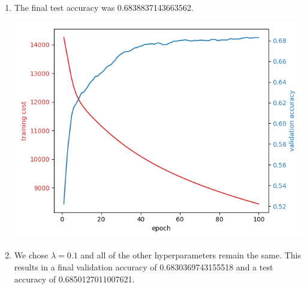 \documentclass{article}
\begin{document}
\begin{enumerate}[label=\arabic*.]
\begin{enumerate}[label=(\roman*)]
\begin{enumerate}[label=(\alph*)]
                    \item The final test accuracy was 0.6838837143663562.

                    \begin{center}
                        \includegraphics[width=0.6\linewidth]{../starter_code/nn_output/3d.png}
                    \end{center}
                \item We chose $\lambda=0.1$ and all of the other hyperparameters remain the same. This results in a final validation accuracy of 0.6830369743155518
and a test accuracy of 0.6850127011007621.


\end{enumerate}
\end{enumerate}
\end{enumerate}
\end{document}
